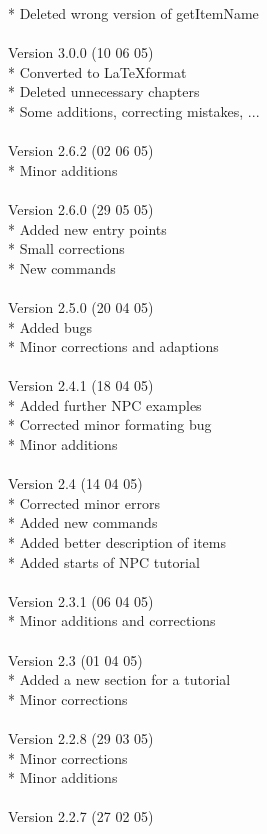 \documentclass[a4paper,10pt,makeidx]{scrreprt}
\begin{document}
* Deleted wrong version of getItemName\\
\\
Version 3.0.0 (10 06 05)\\
* Converted to \LaTeX format\\
* Deleted unnecessary chapters\\
* Some additions, correcting mistakes, ...\\
\\
Version 2.6.2 (02 06 05)\\
* Minor additions\\
\\
Version 2.6.0 (29 05 05)\\
* Added new entry points\\
* Small corrections\\
* New commands\\
\\
Version 2.5.0 (20 04 05)\\
* Added bugs\\
* Minor corrections and adaptions\\
\\
Version 2.4.1 (18 04 05)\\
* Added further NPC examples\\
* Corrected minor formating bug\\
* Minor additions\\
\\
Version 2.4 (14 04 05)\\
* Corrected minor errors\\
* Added new commands\\
* Added better description of items\\
* Added starts of NPC tutorial\\
\\
Version 2.3.1 (06 04 05)\\
* Minor additions and corrections\\
\\
Version 2.3 (01 04 05)\\
* Added a new section for a tutorial\\
* Minor corrections\\
\\
Version 2.2.8 (29 03 05)\\
* Minor corrections\\
* Minor additions\\
\\
Version 2.2.7 (27 02 05)\\
\end{document}
